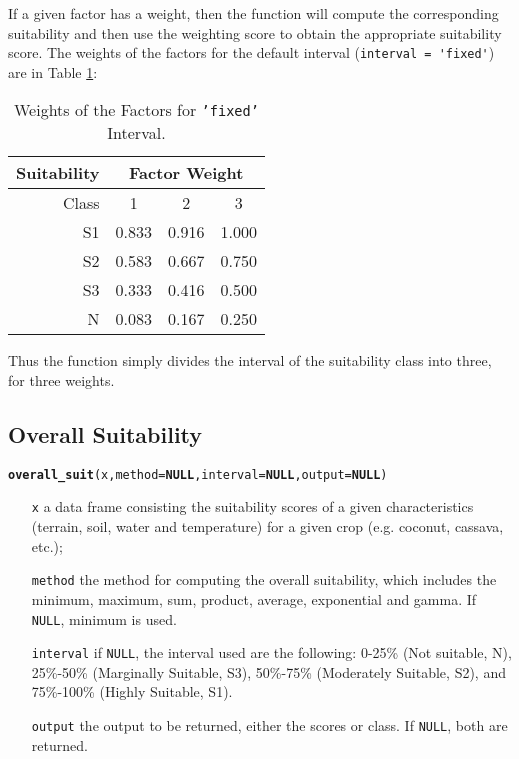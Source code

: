 \documentclass[11pt,fleqn]{article}\usepackage[]{graphicx}\usepackage[]{color}
\makeatletter
\newcommand{\hlstd}[1]{\textcolor[rgb]{0.345,0.345,0.345}{#1}}%
\newcommand{\hlkwa}[1]{\textcolor[rgb]{0.161,0.373,0.58}{\textbf{#1}}}%
\newcommand{\hlkwc}[1]{\textcolor[rgb]{0.333,0.667,0.333}{#1}}%
\newcommand{\hlkwd}[1]{\textcolor[rgb]{0.737,0.353,0.396}{\textbf{#1}}}%
\newenvironment{kframe}{%
 \def\at@end@of@kframe{}%
 \ifinner\ifhmode%
  \def\at@end@of@kframe{\end{minipage}}%
  \begin{minipage}{\columnwidth}%
 \fi\fi%
 \def\FrameCommand##1{\hskip\@totalleftmargin \hskip-\fboxsep
 \colorbox{shadecolor}{##1}\hskip-\fboxsep
     \hskip-\linewidth \hskip-\@totalleftmargin \hskip\columnwidth}%
 \MakeFramed {\advance\hsize-\width
   \@totalleftmargin\z@ \linewidth\hsize
   \@setminipage}}%
 {\par\unskip\endMakeFramed%
 \at@end@of@kframe}
\newenvironment{knitrout}{}{} %
\makeatother
\begin{document}
If a given factor has a weight, then the function will compute the corresponding suitability and then use the weighting score to obtain the appropriate suitability score. The weights of the factors for the default interval (\verb|interval = 'fixed'|) are in Table \ref{tab:fixweight}:
\begin{table}[!h]
\begin{tabular}{r|ccc}
\toprule
Suitability&\multicolumn{3}{|c}{Factor Weight}\\
\midrule
Class&1&2&3\\
\midrule
S1&0.833&0.916&1.000\\
S2&0.583&0.667&0.750\\
S3&0.333&0.416&0.500\\
N&0.083&0.167&0.250\\
\bottomrule
\end{tabular}
\caption{Weights of the Factors for \texttt{'fixed'} Interval.}
\label{tab:fixweight}
\end{table}

Thus the function simply divides the interval of the suitability class into three, for three weights.
\subsection{Overall Suitability}
\begin{knitrout}
\color{fgcolor}\begin{kframe}
\begin{alltt}
\hlkwd{overall_suit}\hlstd{(x,} \hlkwc{method} \hlstd{=} \hlkwa{NULL}\hlstd{,} \hlkwc{interval} \hlstd{=} \hlkwa{NULL}\hlstd{,} \hlkwc{output} \hlstd{=} \hlkwa{NULL}\hlstd{)}
\end{alltt}
\end{kframe}
\end{knitrout}
\vspace{-0.5cm}
\begin{itemize}[leftmargin=\dimexpr\linewidth-11.8cm-\rightmargin\relax]
\item[\texttt{x}] a data frame consisting the suitability scores of a given characteristics (terrain, soil, water and temperature) for a given crop (e.g. coconut, cassava, etc.);
\item[\texttt{method}] the method for computing the overall suitability, which includes the minimum, maximum, sum, product, average, exponential and gamma. If \verb|NULL|, minimum is used.
\item[\texttt{interval}] if \verb|NULL|, the interval used are the following: 0-25\% (Not suitable, N), 25\%-50\% (Marginally Suitable, S3), 50\%-75\% (Moderately Suitable, S2), and 75\%-100\% (Highly Suitable, S1).
\item[\texttt{output}] the output to be returned, either the scores or class. If \verb|NULL|, both are returned.
\end{itemize}
\end{document}
